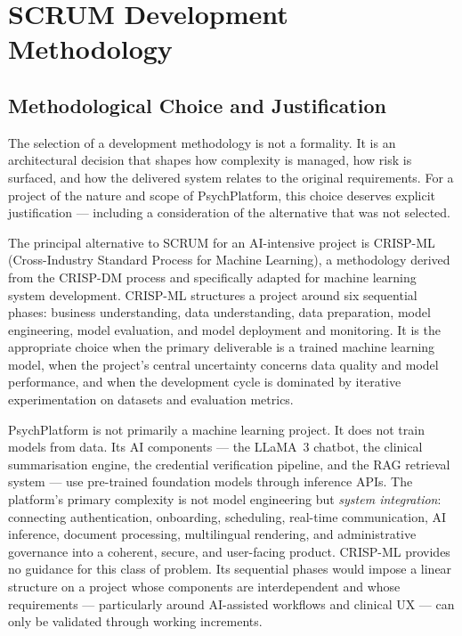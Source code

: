 \documentclass[a4paper,12pt]{report}
\begin{document}
\section{SCRUM Development Methodology}

\subsection{Methodological Choice and Justification}

The selection of a development methodology is not a formality. It is an architectural decision that shapes how complexity is managed, how risk is surfaced, and how the delivered system relates to the original requirements. For a project of the nature and scope of PsychPlatform, this choice deserves explicit justification --- including a consideration of the alternative that was not selected.

The principal alternative to SCRUM for an AI-intensive project is CRISP-ML (Cross-Industry Standard Process for Machine Learning), a methodology derived from the CRISP-DM process and specifically adapted for machine learning system development. CRISP-ML structures a project around six sequential phases: business understanding, data understanding, data preparation, model engineering, model evaluation, and model deployment and monitoring. It is the appropriate choice when the primary deliverable is a trained machine learning model, when the project's central uncertainty concerns data quality and model performance, and when the development cycle is dominated by iterative experimentation on datasets and evaluation metrics.

PsychPlatform is not primarily a machine learning project. It does not train models from data. Its AI components --- the LLaMA~3 chatbot, the clinical summarisation engine, the credential verification pipeline, and the RAG retrieval system --- use pre-trained foundation models through inference APIs. The platform's primary complexity is not model engineering but \emph{system integration}: connecting authentication, onboarding, scheduling, real-time communication, AI inference, document processing, multilingual rendering, and administrative governance into a coherent, secure, and user-facing product. CRISP-ML provides no guidance for this class of problem. Its sequential phases would impose a linear structure on a project whose components are interdependent and whose requirements --- particularly around AI-assisted workflows and clinical UX --- can only be validated through working increments.
\end{document}
